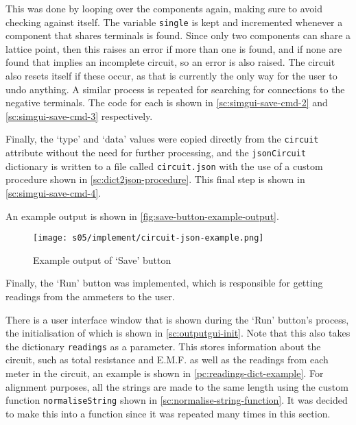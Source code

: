 
    This was done by looping over the components again, making sure to avoid checking against itself.
    The variable \verb|single| is kept and incremented whenever a component that shares terminals is found. 
    Since only two components can share a lattice point, then this raises an error if more than one is found, and if none are found that implies an incomplete circuit, so an error is also raised. 
    The circuit also resets itself if these occur, as that is currently the only way for the user to undo anything. 
    A similar process is repeated for searching for connections to the negative terminals.
    The code for each is shown in \autoref{sc:simgui-save-cmd-2} and \autoref{sc:simgui-save-cmd-3} respectively. 


    Finally, the `type' and `data' values were copied directly from the \verb|circuit| attribute without the need for further processing, and the \verb|jsonCircuit| dictionary is written to a file called \verb|circuit.json| with the use of a custom procedure shown in \autoref{sc:dict2json-procedure}. 
    This final step is shown in \autoref{sc:simgui-save-cmd-4}. 

    An example output is shown in \autoref{fig:save-button-example-output}.

    \begin{figure}[!ht]
        \centering
        \texttt{[image: s05/implement/circuit-json-example.png]}
        \caption{Example output of `Save' button}
        \label{fig:save-button-example-output}
    \end{figure}



    Finally, the `Run' button was implemented, which is responsible for getting readings from the ammeters to the user. 

    
    There is a user interface window that is shown during the `Run' button's process, the initialisation of which is shown in \autoref{sc:outputgui-init}. 
    Note that this also takes the dictionary \verb|readings| as a parameter.
    This stores information about the circuit, such as total resistance and E.M.F. as well as the readings from each meter in the circuit, an example is shown in \autoref{pc:readings-dict-example}. 
    For alignment purposes, all the strings are made to the same length using the custom function \verb|normaliseString| shown in \autoref{sc:normalise-string-function}. 
    It was decided to make this into a function since it was repeated many times in this section. 


